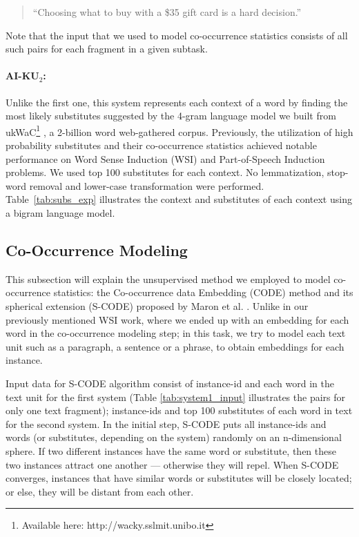 \documentclass[11pt]{article}
\begin{document}
\begin{quote}
``Choosing what to buy with a \$35 gift card is a hard decision.''
\end{quote}

Note that the input that we used to model co-occurrence statistics consists of all such pairs for each fragment in a given subtask. 

\paragraph{AI-KU$_2$:} Unlike the first one, this system represents each context of a word by finding the most likely substitutes suggested by the 4-gram language model we built from ukWaC\footnote{Available here: http://wacky.sslmit.unibo.it} \cite{ukWaC}, a 2-billion word web-gathered corpus. Previously, the utilization of high probability substitutes and their co-occurrence statistics achieved notable performance on Word Sense Induction (WSI) \cite{baskaya13ai} and Part-of-Speech Induction \cite{yatbaz2012learning} problems. We used top 100 substitutes for each context. No lemmatization, stop-word removal and lower-case transformation were performed. Table~\ref{tab:subs_exp} illustrates the context and substitutes of each context using a bigram language model.

\subsection{Co-Occurrence Modeling}

This subsection will explain the unsupervised method we employed to model co-occurrence statistics: the Co-occurrence data Embedding (CODE) method \cite{globerson-CODE} and its spherical extension (S-CODE) proposed by Maron et al. . Unlike in our previously mentioned WSI work, where we ended up with an embedding for each
word in the co-occurrence modeling step; in this task, we try to model each text unit such as a paragraph, a sentence or a phrase, to obtain embeddings for each instance. 

Input data for S-CODE algorithm consist of instance-id and each word in the text unit for the first system (Table \ref{tab:system1_input} illustrates the pairs for only one text fragment); instance-ids and top 100 substitutes of each word in text for the second system. In the initial step, S-CODE puts all instance-ids and words (or substitutes, depending on the system) randomly on an n-dimensional sphere. If two different instances have the same word or substitute, then these two instances attract one another --- otherwise they will repel. When S-CODE converges, instances that have similar words or substitutes will be closely located; or else, they will be distant from each other. 
\end{document}

